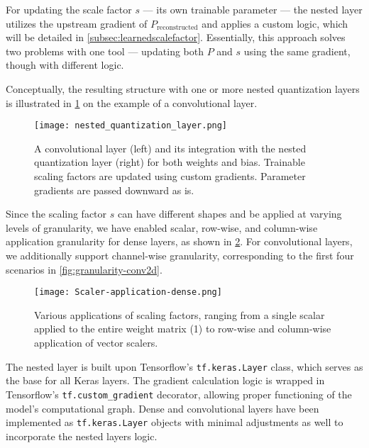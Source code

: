 For updating the scale factor \( s \) — its own trainable parameter — 
the nested layer utilizes the upstream gradient of \( P_{\text{reconstructed}} \)
and applies a custom logic, which will be detailed in \cref{subsec:learnedscalefactor}. 
Essentially, this approach solves two problems with one tool — updating both 
\( P \) and \( s \) using the same gradient, though with different logic.

Conceptually, the resulting structure with one or more nested quantization layers is illustrated in \cref{fig:nested_quantization}
on the example of a convolutional layer.

\begin{figure}[h!]
  \centering
  \texttt{[image: nested\_quantization\_layer.png]}
  \caption{A convolutional layer (left) and its integration with the nested quantization layer (right) for both weights and bias.
  Trainable scaling factors are updated using custom gradients. Parameter gradients are passed downward as is.}
  \label{fig:nested_quantization}
\end{figure}

Since the scaling factor \( s \) can have different shapes and be applied at varying levels of granularity,
we have enabled scalar, row-wise, and column-wise application granularity for dense layers,
as shown in \cref{fig:scaler-application-dense}. 
For convolutional layers, we additionally support channel-wise granularity,
corresponding to the first four scenarios in \cref{fig:granularity-conv2d}.

\begin{figure}[t!]
  \centering
  \texttt{[image: Scaler-application-dense.png]}
  \caption{Various applications of scaling factors, ranging from a single scalar applied to the entire weight matrix (1) to row-wise and column-wise application of vector scalers.}
  \label{fig:scaler-application-dense}
\end{figure}

The nested layer is built upon Tensorflow's \texttt{tf.keras.Layer} class,
which serves as the base for all Keras layers. The gradient calculation logic is wrapped
in Tensorflow's \texttt{tf.custom\_gradient} decorator, allowing proper functioning of the 
model's computational graph. Dense and convolutional layers have been implemented as 
\texttt{tf.keras.Layer} objects with minimal adjustments as well to incorporate the nested layers logic.


